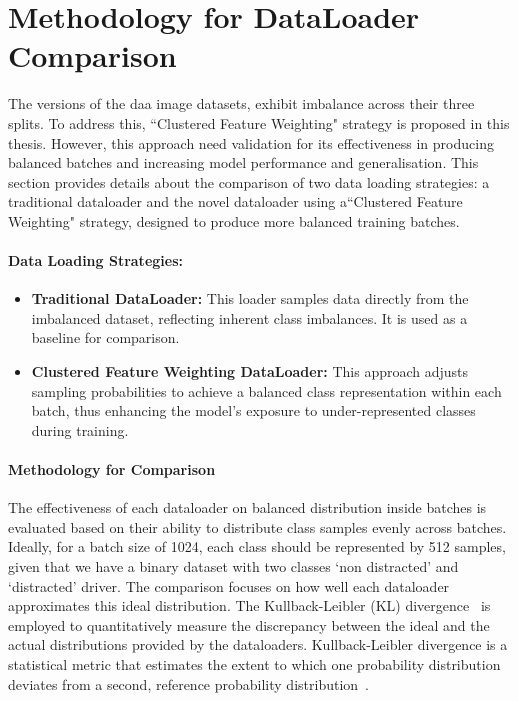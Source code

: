 \section{Methodology for DataLoader Comparison}
The versions of the \gls{daa} image datasets, exhibit imbalance across their three splits. To address this, ``Clustered Feature Weighting" strategy is proposed in this thesis. However, this approach need validation for its effectiveness in producing balanced batches and increasing model performance and generalisation. This section provides details about the comparison of two data loading strategies: a traditional dataloader and the novel dataloader using a``Clustered Feature Weighting" strategy, designed to produce more balanced training batches.

\paragraph{Data Loading Strategies:}
\begin{itemize}
    \item \textbf{Traditional DataLoader:} This loader samples data directly from the imbalanced dataset, reflecting inherent class imbalances. It is used as a baseline for comparison.
    \item \textbf{Clustered Feature Weighting DataLoader:} This approach adjusts sampling probabilities to achieve a balanced class representation within each batch, thus enhancing the model's exposure to under-represented classes during training.
\end{itemize}

\paragraph{Methodology for Comparison}
The effectiveness of each dataloader on balanced distribution inside batches is evaluated based on their ability to distribute class samples evenly across batches. Ideally, for a batch size of 1024, each class should be represented by 512 samples, given that we have a binary dataset with two classes `non distracted' and `distracted' driver. The comparison focuses on how well each dataloader approximates this ideal distribution. The Kullback-Leibler (KL) divergence~\citep{KL_div_kullback1997information} is employed to quantitatively measure the discrepancy between the ideal and the actual distributions provided by the dataloaders. Kullback-Leibler divergence is a statistical metric that estimates the extent to which one probability distribution deviates from a second, reference probability distribution~\citep{KL_div_kullback1997information}.

